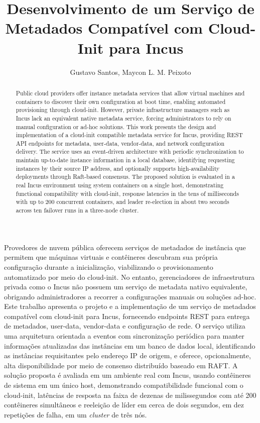 \documentclass[12pt]{article}
\title{Desenvolvimento de um Serviço de Metadados Compatível com Cloud-Init para Incus}
\author{Gustavo Santos\inst{1}, Maycon L. M. Peixoto\inst{1}}
\begin{document}
 
	
\maketitle

\begin{abstract}
    Public cloud providers offer instance metadata services that allow virtual machines and containers to discover their own configuration at boot time, enabling automated provisioning through cloud-init. However, private infrastructure managers such as Incus lack an equivalent native metadata service, forcing administrators to rely on manual configuration or ad-hoc solutions. This work presents the design and implementation of a cloud-init compatible metadata service for Incus, providing REST API endpoints for metadata, user-data, vendor-data, and network configuration delivery. The service uses an event-driven architecture with periodic synchronization to maintain up-to-date instance information in a local database, identifying requesting instances by their source IP address, and optionally supports high-availability deployments through Raft-based consensus. The proposed solution is evaluated in a real Incus environment using system containers on a single host, demonstrating functional compatibility with cloud-init, response latencies in the tens of milliseconds with up to 200 concurrent containers, and leader re-election in about two seconds across ten failover runs in a three-node cluster.
\end{abstract}
\begin{resumo}
    Provedores de nuvem pública oferecem serviços de metadados de instância que permitem que máquinas virtuais e contêineres descubram sua própria configuração durante a inicialização, viabilizando o provisionamento automatizado por meio do cloud-init. No entanto, gerenciadores de infraestrutura privada como o Incus não possuem um serviço de metadata nativo equivalente, obrigando administradores a recorrer a configurações manuais ou soluções ad-hoc. Este trabalho apresenta o projeto e a implementação de um serviço de metadados compatível com cloud-init para Incus, fornecendo endpoints REST para entrega de metadados, user-data, vendor-data e configuração de rede. O serviço utiliza uma arquitetura orientada a eventos com sincronização periódica para manter informações atualizadas das instâncias em um banco de dados local, identificando as instâncias requisitantes pelo endereço IP de origem, e oferece, opcionalmente, alta disponibilidade por meio de consenso distribuído baseado em RAFT. A solução proposta é avaliada em um ambiente real com Incus, usando contêineres de sistema em um único host, demonstrando compatibilidade funcional com o cloud-init, latências de resposta na faixa de dezenas de milissegundos com até 200 contêineres simultâneos e reeleição de líder em cerca de dois segundos, em dez repetições de falha, em um \textit{cluster} de três nós.
\end{resumo}









\end{document}
